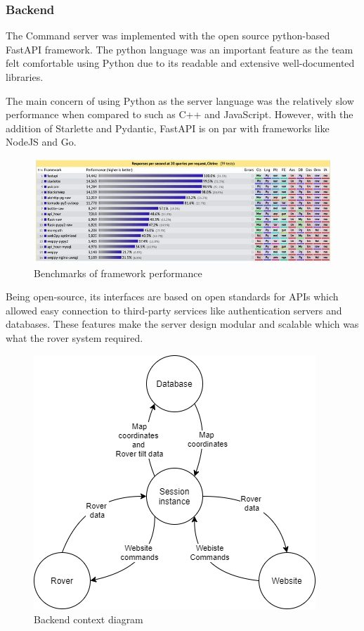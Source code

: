 \documentclass[11pt, a4paper]{article}
\begin{document}
\pagebreak
\subsubsection{Backend}

The Command server was implemented with the open source python-based FastAPI framework. The python language was an important feature as the team felt comfortable using Python due to its readable and extensive well-documented libraries. 

The main concern of using Python as the server language was the relatively slow performance when compared to such as C++ and JavaScript. However, with the addition of Starlette and Pydantic, FastAPI is on par with frameworks like NodeJS and Go. 

\begin{figure} [h!]
    \centering
    \includegraphics[scale=0.7]{Command_FastAPI.JPG}
    \caption{Benchmarks of framework performance \cite{FastAPI}}
\end{figure}

Being open-source, its interfaces are based on open standards for APIs which allowed easy connection to third-party services like authentication servers and databases. These features make the server design modular and scalable which was what the rover system required.  

\begin{figure} [h!]
    \centering
    \includegraphics[scale=0.5]{Command_Backend.png}
    \caption{Backend context diagram }
\end{figure}
\end{document}
